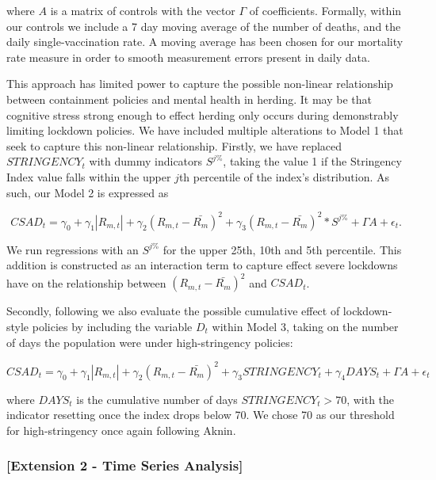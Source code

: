 \documentclass[12pt]{article}
\numberwithin{table}{section}   %
\begin{document}
where $A$ is a matrix of controls with the vector $\Gamma$ of coefficients. Formally, within our controls we include a 7 day moving average of the number of deaths, and the daily single-vaccination rate. A moving average has been chosen for our mortality rate measure in order to smooth measurement errors present in daily data.

This approach has limited power to capture the possible non-linear relationship between containment policies and mental health in herding. It may be that cognitive stress strong enough to effect herding only occurs during demonstrably limiting lockdown policies. We have included multiple alterations to Model 1 that seek to capture this non-linear relationship. Firstly, we have replaced $STRINGENCY_t$ with dummy indicators $S^{j\%}$, taking the value 1 if the Stringency Index value falls within the upper $j$th percentile of the index’s distribution. As such, our Model 2 is expressed as

\begin{equation}\label{model-3}
CSAD_t=\gamma_0+\gamma_1 |R_{m,t}|+\gamma_2 (R_{m,t}-\bar{R_m})^2+\gamma_3(R_{m,t}-\bar{R_m})^2*S^{j\%}+\Gamma{A}+\epsilon_t.
\end{equation}

We run regressions with an $S^{j\%}$ for the upper 25th, 10th and 5th percentile. This addition is constructed as an interaction term to capture effect severe lockdowns have on the relationship between $(R_{m,t}-\bar{R_m})^2$ and $CSAD_t$.

Secondly, following \citet{aknin} we also evaluate the possible cumulative effect of lockdown-style policies by including the variable $D_t$ within Model 3, taking on the number of days the population were under high-stringency policies:

\begin{equation}\label{model-4}
CSAD_t=\gamma_0+\gamma_1 |R_{m,t}|+\gamma_2 (R_{m,t}-\bar{R_m})^2+\gamma_3STRINGENCY_t+\gamma_4DAYS_t+\Gamma{A}+\epsilon_t
\end{equation}

where $DAYS_t$ is the cumulative number of days $STRINGENCY_t>70$, with the indicator resetting once the index drops below 70. We chose 70 as our threshold for high-stringency once again following Aknin.

\subsubsection*{[Extension 2 - Time Series Analysis]}
\end{document}
